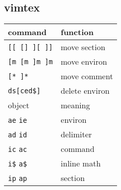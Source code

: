 \subsection*{vimtex}
\begin{tabular}{l l}
  \toprule
  command                   & function       \\
  \midrule
  \texttt{[[ [] ][ ]]}      & move section   \\
  \texttt{[m [m ]m ]m}      & move environ   \\
  \texttt{[* ]*}            & move comment   \\
  \texttt{ds[ced\$]}        & delete environ \\
  \midrule
  \midrule
  object                    & meaning        \\
  \midrule
  \texttt{ae} \texttt{ie}   & environ        \\
  \texttt{ad} \texttt{id}   & delimiter      \\
  \texttt{ic} \texttt{ac}   & command        \\
  \texttt{i\$} \texttt{a\$} & inline math    \\
  \texttt{ip} \texttt{ap}   & section        \\
  \bottomrule
\end{tabular}
